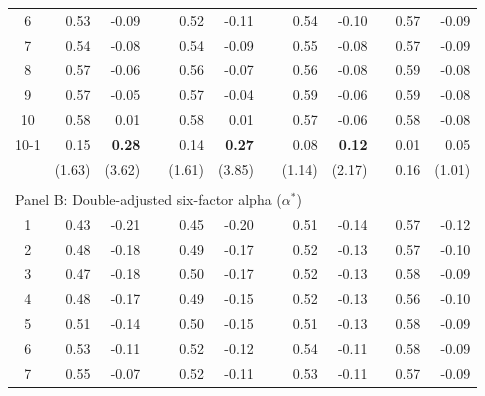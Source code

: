 \begin{singlespacing}
\begin{table}[H]
\begin{tabular}{crrrrrrrrrrr}
6    & 0.53   & -0.09         &  & 0.52   & -0.11         &  & 0.54   & -0.10         &  & 0.57 & -0.09  \\
7    & 0.54   & -0.08         &  & 0.54   & -0.09         &  & 0.55   & -0.08         &  & 0.57 & -0.09  \\
8    & 0.57   & -0.06         &  & 0.56   & -0.07         &  & 0.56   & -0.08         &  & 0.59 & -0.08  \\
9    & 0.57   & -0.05         &  & 0.57   & -0.04         &  & 0.59   & -0.06         &  & 0.59 & -0.08  \\
10   & 0.58   & 0.01          &  & 0.58   & 0.01          &  & 0.57   & -0.06         &  & 0.58 & -0.08  \\
10-1 & 0.15   & \textbf{0.28} &  & 0.14   & \textbf{0.27} &  & 0.08   & \textbf{0.12} &  & 0.01 & 0.05   \\
     & (1.63) & (3.62)        &  & (1.61) & (3.85)        &  & (1.14) & (2.17)        &  & 0.16 & (1.01)     \\
      &                 &                 &  &                 &                 &  &          &                   &  &           &                   \\
\multicolumn{12}{l}{Panel B: Double-adjusted six-factor alpha ($\alpha^*$)}                                                                                         \\
1    & 0.43          & -0.21         &  & 0.45          & -0.20         &  & 0.51   & -0.14         &  & 0.57   & -0.12         \\
2    & 0.48          & -0.18         &  & 0.49          & -0.17         &  & 0.52   & -0.13         &  & 0.57   & -0.10         \\
3    & 0.47          & -0.18         &  & 0.50          & -0.17         &  & 0.52   & -0.13         &  & 0.58   & -0.09         \\
4    & 0.48          & -0.17         &  & 0.49          & -0.15         &  & 0.52   & -0.13         &  & 0.56   & -0.10         \\
5    & 0.51          & -0.14         &  & 0.50          & -0.15         &  & 0.51   & -0.13         &  & 0.58   & -0.09         \\
6    & 0.53          & -0.11         &  & 0.52          & -0.12         &  & 0.54   & -0.11         &  & 0.58   & -0.09         \\
7    & 0.55          & -0.07         &  & 0.52          & -0.11         &  & 0.53   & -0.11         &  & 0.57   & -0.09         \\

\end{tabular}
\end{table}
\end{singlespacing}
